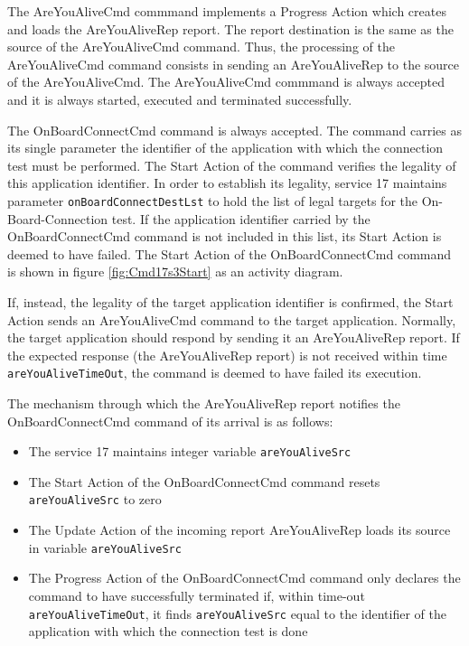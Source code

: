 \documentclass{pnp_article}
\begin{document}
The AreYouAliveCmd commmand implements a Progress Action which creates and loads the AreYouAliveRep report. The report destination is the same as the source of the AreYouAliveCmd command. Thus, the processing of the AreYouAliveCmd command consists in sending an AreYouAliveRep to the source of the AreYouAliveCmd. The AreYouAliveCmd commmand is always accepted and it is always started, executed and terminated successfully.

The OnBoardConnectCmd command is always accepted. The command carries as its single parameter the identifier of the application with which the connection test must be performed. The Start Action of the command verifies the legality of this application identifier. In order to establish its legality, service 17 maintains parameter \texttt{onBoardConnectDestLst} to hold the list of legal targets for the On-Board-Connection test. If the application identifier carried by the OnBoardConnectCmd command is not included in this list, its Start Action is deemed to have failed. The Start Action of the OnBoardConnectCmd command is shown in figure \ref{fig:Cmd17s3Start} as an activity diagram.

If, instead, the legality of the target application identifier is confirmed, the Start Action sends an AreYouAliveCmd command to the target application. Normally, the target application should respond by sending it an AreYouAliveRep report. If the expected response (the AreYouAliveRep report) is not received within time \texttt{areYouAliveTimeOut}, the command is deemed to have failed its execution.

The mechanism through which the AreYouAliveRep report notifies the OnBoardConnectCmd command of its arrival is as follows:

\begin{itemize}
\item The service 17 maintains integer variable \texttt{areYouAliveSrc}
\item The Start Action of the OnBoardConnectCmd command resets \texttt{areYouAliveSrc} to zero
\item The Update Action of the incoming report AreYouAliveRep loads its source in variable \texttt{areYouAliveSrc}
\item The Progress Action of the OnBoardConnectCmd command only declares the command to have successfully terminated if, within time-out \texttt{areYouAliveTimeOut}, it finds \texttt{areYouAliveSrc} equal to the identifier of the application with which the connection test is done
\end{itemize}
\end{document}
